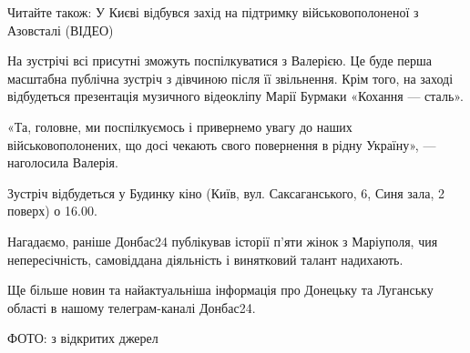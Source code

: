 Читайте також: У Києві відбувся захід на підтримку військовополоненої з
Азовсталі (ВІДЕО)

На зустрічі всі присутні зможуть поспілкуватися з Валерією. Це буде перша
масштабна публічна зустріч з дівчиною після її звільнення. Крім того, на заході
відбудеться презентація музичного відеокліпу Марії Бурмаки «Кохання — сталь».

«Та, головне, ми поспілкуємось і привернемо увагу до наших військовополонених,
що досі чекають свого повернення в рідну Україну», — наголосила Валерія.

Зустріч відбудеться у Будинку кіно (Київ, вул. Саксаганського, 6, Синя зала, 2
поверх) о 16.00.

Нагадаємо, раніше Донбас24 публікував історії п'яти жінок з Маріуполя, чия
непересічність, самовіддана діяльність і винятковий талант надихають.

Ще більше новин та найактуальніша інформація про Донецьку та Луганську області
в нашому телеграм-каналі Донбас24.

ФОТО: з відкритих джерел
